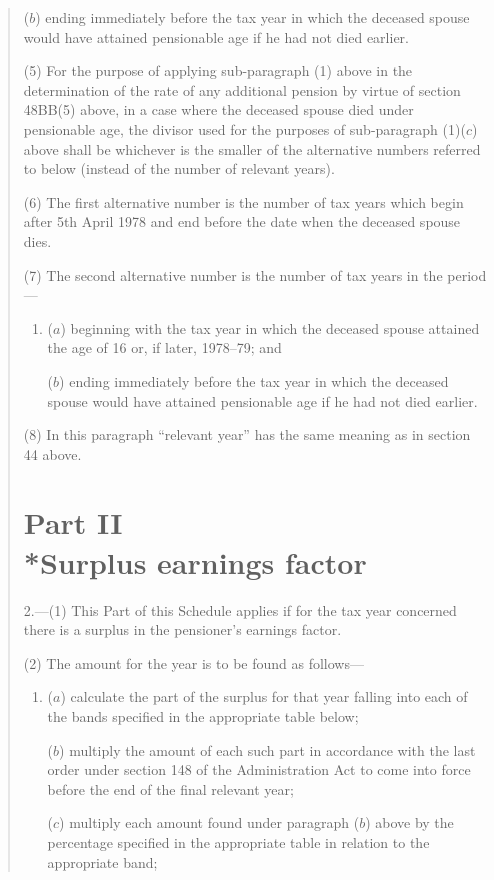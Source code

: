 \documentclass[12pt,a4paper]{article}
\begin{document}
\begin{quotation}
\begin{enumerate}
($b$) ending immediately before the tax year in which the deceased spouse would have attained pensionable age if he had not died earlier.
\end{enumerate}

(5) For the purpose of applying sub-paragraph (1)  above in the determination of the rate of any additional pension by virtue of section 48BB(5)  above, in a case where the deceased spouse died under pensionable age, the divisor used for the purposes of sub-paragraph (1)($c$)  above shall be whichever is the smaller of the alternative numbers referred to below (instead of the number of relevant years).

(6) The first alternative number is the number of tax years which begin after 5th April 1978 and end before the date when the deceased spouse dies.

(7) The second alternative number is the number of tax years in the period—
\begin{enumerate}\item[]
($a$) beginning with the tax year in which the deceased spouse attained the age of 16 or, if later, 1978--79; and

($b$) ending immediately before the tax year in which the deceased spouse would have attained pensionable age if he had not died earlier.
\end{enumerate}

(8) In this paragraph “relevant year” has the same meaning as in section 44 above.

\section*{Part II\\*Surplus earnings factor}

2.---(1) This Part of this Schedule applies if for the tax year concerned there is a surplus in the pensioner’s earnings factor.

(2) The amount for the year is to be found as follows—
\begin{enumerate}\item[]
($a$) calculate the part of the surplus for that year falling into each of the bands specified in the appropriate table below;

($b$) multiply the amount of each such part in accordance with the last order under section 148 of the Administration Act to come into force before the end of the final relevant year;

($c$) multiply each amount found under paragraph ($b$)  above by the percentage specified in the appropriate table in relation to the appropriate band;


\end{enumerate}
\end{quotation}
\end{document}
